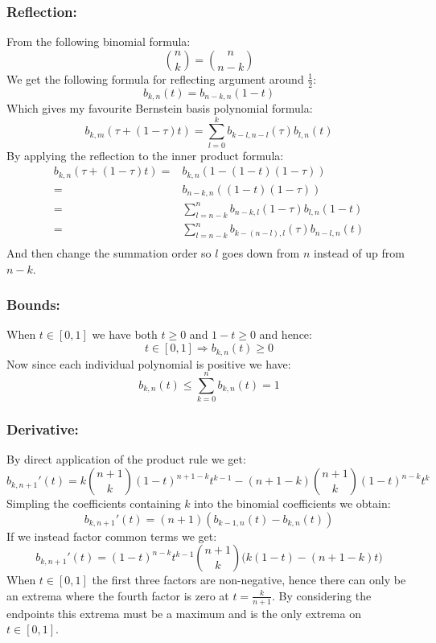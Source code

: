 \subsubsection{Reflection:}
From the following binomial formula:
\[\binom{n}{k}=\binom{n}{n-k}\]
We get the following formula for reflecting argument around $\frac{1}{2}$:
\[b_{k,n}(t) = b_{n-k,n}(1-t)\]
Which gives my favourite Bernstein basis polynomial formula: 
\[ b_{k,m}(\tau+(1-\tau)t) = \sum_{l=0}^kb_{k-l,n-l}(\tau)b_{l,n}(t) \]
By applying the reflection to the inner product formula:
\[\begin{aligned}
	b_{k,n}(\tau+(1-\tau)t) =& b_{k,n}(1-(1-t)(1-\tau))\\
	=& b_{n-k,n}((1-t)(1-\tau))\\
	=&\sum_{l=n-k}^nb_{n-k,l}(1-\tau)b_{l,n}(1-t)\\
	=&\sum_{l=n-k}^nb_{k-(n-l),l}(\tau)b_{n-l,n}(t)\\
\end{aligned}\]
And then change the summation order so $l$ goes down from $n$ instead of up from $n-k$.

\subsubsection{Bounds:}
When $t\in[0,1]$ we have both $t\geq0$ and $1-t\geq0$ and hence:
\[t\in [0,1] \Rightarrow b_{k,n}(t)\geq0 \]
Now since each individual polynomial is positive we have:
\[b_{k,n}(t) \leq \sum_{k=0}^nb_{k,n}(t) = 1\]

\subsubsection{Derivative:}
By direct application of the product rule we get:
\[b_{k,n+1}'(t) = k\binom{n+1}{k}(1-t)^{n+1-k}t^{k-1}-(n+1-k)\binom{n+1}{k}(1-t)^{n-k}t^k\]
Simpling the coefficients containing $k$ into the binomial coefficients we obtain:
\[b_{k,n+1}'(t) = (n+1)(b_{k-1,n}(t)-b_{k,n}(t))\]
If we instead factor common terms we get:
\[b_{k,n+1}'(t) = (1-t)^{n-k}t^{k-1}\binom{n+1}{k}\bigg(k(1-t)-(n+1-k)t\bigg)\]
When $t\in[0,1]$ the first three factors are non-negative,
hence there can only be an extrema where the fourth factor is zero at $t=\frac{k}{n+1}$.
By considering the endpoints this extrema must be a maximum and is the only extrema on $t\in[0,1]$.

